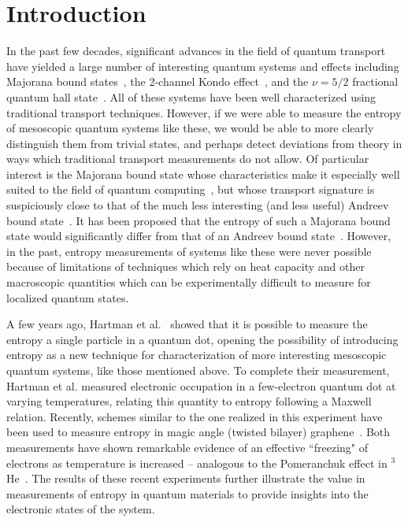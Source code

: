 
\chapter{Introduction}
\label{ch:Introduction}


In the past few decades, significant advances in the field of quantum transport have yielded a large number of interesting quantum systems and effects including Majorana bound states~\cite{frolovmajorana}, the 2-channel Kondo effect~\cite{goldhaber-2ck}, and the $\nu = 5/2$ fractional quantum hall state~\cite{Eisenstein5_2}. All of these systems have been well characterized using traditional transport techniques. However, if we were able to measure the entropy of mesoscopic quantum systems like these, we would be able to more clearly distinguish them from trivial states, and perhaps detect deviations from theory in ways which traditional transport measurements do not allow. Of particular interest is the Majorana bound state whose characteristics make it especially well suited to the field of quantum computing~\cite{simon, kitaev}, but whose transport signature is suspiciously close to that of the much less interesting (and less useful) Andreev bound state~\cite{frolov_mirage}. It has been proposed that the entropy of such a Majorana bound state would significantly differ from that of an Andreev bound state~\cite{majorana_fractional}. However, in the past, entropy measurements of systems like these were never possible because of limitations of techniques which rely on heat capacity and other macroscopic quantities which can be experimentally difficult to measure for localized quantum states.

A few years ago, Hartman et al.~\cite{nikentropy} showed that it is possible to measure the entropy a single \spinh particle in a quantum dot, opening the possibility of introducing entropy as a new technique for characterization of more interesting mesoscopic quantum systems, like those mentioned above. To complete their measurement, Hartman et al. measured electronic occupation in a few-electron quantum dot at varying temperatures, relating this quantity to entropy following a Maxwell relation. Recently, schemes similar to the one realized in this experiment have been used to measure entropy in magic angle (twisted bilayer) graphene~\cite{afy_entropy, pablo_entropy}. Both measurements have shown remarkable evidence of an effective ``freezing" of electrons as temperature is increased -- analogous to the Pomeranchuk effect in $^3$He~\cite{pomeranchuk1950theory}. The results of these recent experiments further illustrate the value in measurements of entropy in quantum materials to provide insights into the electronic states of the system. 

